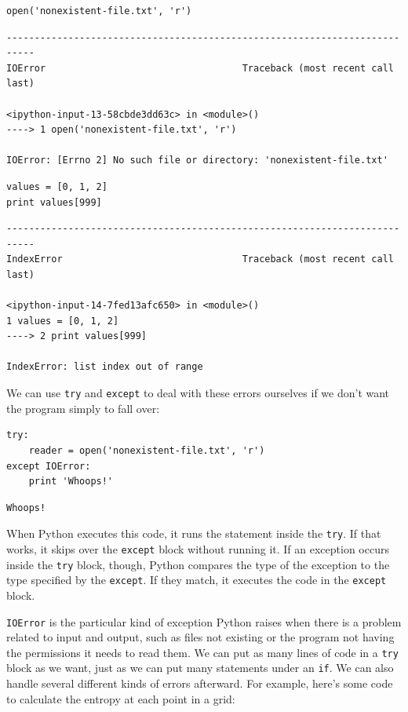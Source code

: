 \documentclass{book}
\begin{document}
\begin{verbatim}
open('nonexistent-file.txt', 'r')
\end{verbatim}

\begin{verbatim}
---------------------------------------------------------------------------
IOError                                   Traceback (most recent call last)

<ipython-input-13-58cbde3dd63c> in <module>()
----> 1 open('nonexistent-file.txt', 'r')

IOError: [Errno 2] No such file or directory: 'nonexistent-file.txt'
\end{verbatim}

\begin{verbatim}
values = [0, 1, 2]
print values[999]
\end{verbatim}

\begin{verbatim}
---------------------------------------------------------------------------
IndexError                                Traceback (most recent call last)

<ipython-input-14-7fed13afc650> in <module>()
1 values = [0, 1, 2]
----> 2 print values[999]

IndexError: list index out of range
\end{verbatim}

We can use \texttt{try} and \texttt{except} to deal with these errors
ourselves if we don't want the program simply to fall over:

\begin{verbatim}
try:
    reader = open('nonexistent-file.txt', 'r')
except IOError:
    print 'Whoops!'
\end{verbatim}

\begin{verbatim}
Whoops!
\end{verbatim}

When Python executes this code, it runs the statement inside the
\texttt{try}. If that works, it skips over the \texttt{except} block
without running it. If an exception occurs inside the \texttt{try}
block, though, Python compares the type of the exception to the type
specified by the \texttt{except}. If they match, it executes the code in
the \texttt{except} block.

\texttt{IOError} is the particular kind of exception Python raises when
there is a problem related to input and output, such as files not
existing or the program not having the permissions it needs to read
them. We can put as many lines of code in a \texttt{try} block as we
want, just as we can put many statements under an \texttt{if}. We can
also handle several different kinds of errors afterward. For example,
here's some code to calculate the entropy at each point in a grid:
\end{document}
